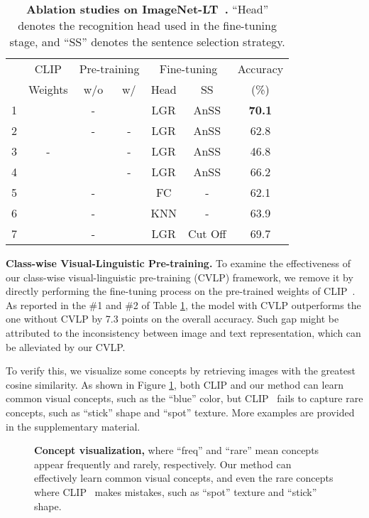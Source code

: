\documentclass[runningheads]{llncs}
\newlength\savedwidth
\newcommand\whline{\noalign{\global\savedwidth\arrayrulewidth\global\arrayrulewidth 0.8pt}\hline\noalign{\global\arrayrulewidth\savedwidth}}
\begin{document}
\begin{table}[t]
    \centering
\setlength{\tabcolsep}{3.0mm}
\begin{tabular}{l|c|c|c|c|c|c}
    \renewcommand{\arraystretch}{0.1}
	\multirow{2}{*}{\#} & CLIP & \multicolumn{2}{c|}{Pre-training} & \multicolumn{2}{c|}{Fine-tuning} & Accuracy \\
	\cline{3-6} 
	& Weights & w/o  & w/  & Head & SS & (\%) \\
	\whline
	\rowcolor{mygray}
	1 &  & - &  & LGR & AnSS & \textbf{70.1} \\
	2 &  & - & - & LGR & AnSS & 62.8  \\
	3 & - &  & - & LGR & AnSS & 46.8  \\
	4 &  &  & - & LGR & AnSS & 66.2  \\
	5 &  & - &  & FC & - & 62.1 \\
	6 &  & - &  & KNN & - & 63.9 \\
	7 &  & - &  & LGR & Cut Off &  69.7  \\
	
\end{tabular} \caption{
    \textbf{Ablation studies on ImageNet-LT~\cite{liu2019large}.} ``Head'' denotes the recognition head used in the fine-tuning stage, and ``SS'' denotes the sentence selection strategy.
    }
    \label{tab:abs}
\end{table}

\noindent\textbf{Class-wise Visual-Linguistic Pre-training.} To examine the effectiveness of our class-wise visual-linguistic pre-training (CVLP) framework, we remove it by directly
performing the fine-tuning process on the pre-trained weights of CLIP~\cite{clip}. As reported in the \#1 and \#2 of Table \ref{tab:abs}, the model with CVLP outperforms the one without CVLP by 7.3 points on the overall accuracy.
Such gap might be attributed to the inconsistency between image and text representation, which can be alleviated by our CVLP.

To verify this, we visualize some concepts by retrieving images with the greatest cosine similarity. As shown in Figure \ref{fig:concept}, both CLIP and our method can learn common visual concepts, such as the ``blue'' color, but  CLIP~\cite{clip} fails to capture rare concepts, such as ``stick'' shape and ``spot'' texture. More examples are provided in the supplementary material.

\begin{figure}
		\centering
		\setlength{\fboxrule}{0pt}
\caption{
		\textbf{Concept visualization,} where ``freq'' and ``rare'' mean concepts appear frequently and rarely, respectively. Our method can effectively learn common visual concepts, and even the rare concepts where CLIP~\cite{clip} makes mistakes, such as ``spot'' texture and ``stick'' shape.
		}
		\label{fig:concept}
\end{figure}
\end{document}
